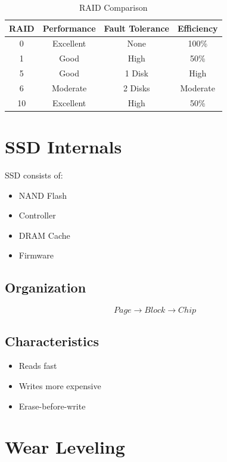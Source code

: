 \begin{table}[h]
\centering
\small
\begin{tabular}{|c|c|c|c|}
\hline
RAID & Performance & Fault Tolerance & Efficiency \\
\hline
0 & Excellent & None & 100\% \\
1 & Good & High & 50\% \\
5 & Good & 1 Disk & High \\
6 & Moderate & 2 Disks & Moderate \\
10 & Excellent & High & 50\% \\
\hline
\end{tabular}
\caption{RAID Comparison}
\end{table}

\section{SSD Internals}

SSD consists of:

\begin{itemize}
\item NAND Flash
\item Controller
\item DRAM Cache
\item Firmware
\end{itemize}

\subsection{Organization}

\[
Page \rightarrow Block \rightarrow Chip
\]

\subsection{Characteristics}

\begin{itemize}
\item Reads fast
\item Writes more expensive
\item Erase-before-write
\end{itemize}

\section{Wear Leveling}

